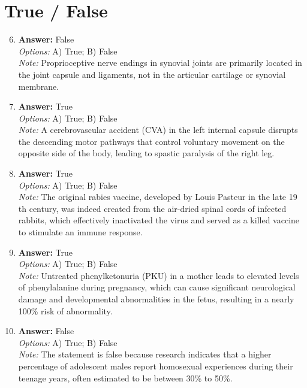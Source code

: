 \documentclass[12pt]{article}
\begin{document}
\section*{True / False}
\begin{enumerate}[label=\arabic*.]
\setcounter{enumi}{5}
\item \textbf{Answer:} False
\\ \textit{Options:} A) True; B) False
\\ \textit{Note:} Proprioceptive nerve endings in synovial joints are primarily located in the joint capsule and ligaments, not in the articular cartilage or synovial membrane.
\item \textbf{Answer:} True
\\ \textit{Options:} A) True; B) False
\\ \textit{Note:} A cerebrovascular accident (CVA) in the left internal capsule disrupts the descending motor pathways that control voluntary movement on the opposite side of the body, leading to spastic paralysis of the right leg.
\item \textbf{Answer:} True
\\ \textit{Options:} A) True; B) False
\\ \textit{Note:} The original rabies vaccine, developed by Louis Pasteur in the late 19 th century, was indeed created from the air-dried spinal cords of infected rabbits, which effectively inactivated the virus and served as a killed vaccine to stimulate an immune response.
\item \textbf{Answer:} True
\\ \textit{Options:} A) True; B) False
\\ \textit{Note:} Untreated phenylketonuria (PKU) in a mother leads to elevated levels of phenylalanine during pregnancy, which can cause significant neurological damage and developmental abnormalities in the fetus, resulting in a nearly 100\% risk of abnormality.
\item \textbf{Answer:} False
\\ \textit{Options:} A) True; B) False
\\ \textit{Note:} The statement is false because research indicates that a higher percentage of adolescent males report homosexual experiences during their teenage years, often estimated to be between 30\% to 50\%.
\end{enumerate}
\end{document}
